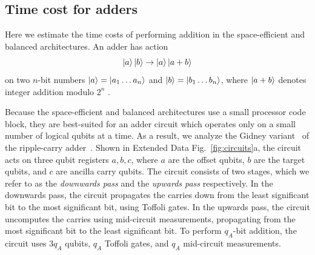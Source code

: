 \documentclass[reprint,twocolumn,secnumarabic,amssymb, aps, prx]{revtex4-2}
\begin{document}
\subsection{Time cost for adders\label{app:adders}}
Here we estimate the time costs of performing addition in the space-efficient and balanced architectures. An adder has action
\begin{equation}
    \ket{a}\ket{b} \to \ket{a}\ket{a+b}
\end{equation}
on two $n$-bit numbers \mbox{$\ket{a} = \ket{a_1\dots a_n}$} and \mbox{$\ket{b} = \ket{b_1\dots b_n}$}, where $\ket{a+b}$ denotes integer addition modulo $2^n$ \cite{cuccaro2004new,gidney2018halving}.

Because the space-efficient and balanced architectures use a small processor code block, they are best-suited for an adder circuit which operates only on a small number of logical qubits at a time. As a result, we analyze the Gidney variant~\cite{gidney2018halving} of the ripple-carry adder~\cite{vedral1996quantum, cuccaro2004new}. Shown in Extended Data Fig.~\ref{fig:circuits}a, the circuit acts on three qubit registers $a,b,c$, where $a$ are the offset qubits, $b$ are the target qubits, and $c$ are ancilla carry qubits. The circuit consists of two stages, which we refer to as the \emph{downwards pass} and the \emph{upwards pass} respectively. In the downwards pass, the circuit propagates the carries down from the least significant bit to the most significant bit, using Toffoli gates. In the upwards pass, the circuit uncomputes the carries using mid-circuit measurements, propagating from the most significant bit to the least significant bit. To perform $q_A$-bit addition, the circuit uses $3q_A$ qubits, $q_A$ Toffoli gates, and $q_A$ mid-circuit measurements.
\end{document}

